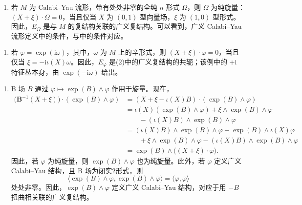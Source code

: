 \begin{example}\label{ex:6.37}
\begin{enumerate}[label=(\arabic*)]
\item 若 $M$ 为 Calabi--Yau 流形，带有处处非零的全纯 $n$ 形式 $\Omega$，则 $\Omega$ 为纯旋量：$(X+\xi)\cdot\Omega=0$，当且仅当 $X$ 为 $(0,1)$ 型向量场，$\xi$ 为 $(1,0)$ 型形式。因此，$E_\Omega$ 是与 $M$ 的复结构关联的广义复结构。可以看到，广义 Calabi--Yau 流形定义中的条件，与中的条件对应。
\end{enumerate}

\begin{enumerate}[label=(\arabic*),start=2]
\item 若 $\varphi=\exp(\mathrm i\omega)$，其中，$\omega$ 为 $M$ 上的辛形式，则 $(X+\xi)\cdot\varphi=0$，当且仅当 $\xi=-\mathrm i\iota(X)\omega$。因此，$E_\varphi$ 是(2)中的广义复结构的共轭；该例中的 $+\mathrm i$ 特征丛本身，由 $\exp(-\mathrm i\omega)$ 给出。
\end{enumerate}

\begin{enumerate}[label=(\arabic*),start=3]
\item B 场 $B$ 通过 $\varphi\mapsto\exp(B)\wedge\varphi$ 作用于旋量。现在，
\[
\begin{aligned}
\bigl(\mathbf B^{-1}(X+\xi)\bigr)\cdot(\exp(B)\wedge\varphi)
&=(X+\xi-\iota(X)B)\cdot(\exp(B)\wedge\varphi)\\
&=\iota(X)(\exp(B)\wedge\varphi)
+\xi\wedge\exp(B)\wedge\varphi\\
&\qquad-(\iota(X)B)\wedge\exp(B)\wedge\varphi\\
&=(\iota(X)B)\wedge\exp(B)\wedge\varphi
+\exp(B)\wedge\iota(X)\varphi\\
&\qquad+\xi\wedge\exp(B)\wedge\varphi
-(\iota(X)B)\wedge\exp(B)\wedge\varphi\\
&=\exp(B)\wedge\bigl((X+\xi)\cdot\varphi\bigr).
\end{aligned}
\]
因此，若 $\varphi$ 为纯旋量，则 $\exp(B)\wedge\varphi$ 也为纯旋量。此外，若 $\varphi$ 定义广义 Calabi--Yau 结构，且 B 场为闭实2形式，则
\[
\langle\exp(B)\wedge\varphi,\exp(B)\wedge\overline\varphi\rangle
=\langle\varphi,\overline\varphi\rangle
\]
处处非零。因此，$\exp(B)\wedge\varphi$ 定义广义 Calabi--Yau 结构，对应于用 $-B$ 扭曲相关联的广义复结构。
\end{enumerate}
\end{example}

